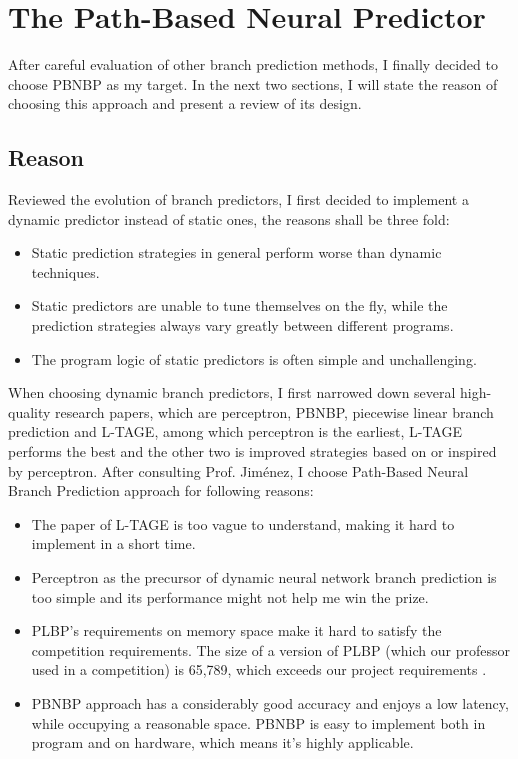 \documentclass[conference]{IEEEtran}
\begin{document}
\section{The Path-Based Neural Predictor}
After careful evaluation of other branch prediction methods, I finally decided to choose PBNBP as my target. In the next two sections, I will state the reason of choosing this approach and present a review of its design.
\subsection{Reason}
Reviewed the evolution of branch predictors, I first decided to implement a dynamic predictor instead of static ones, the reasons shall be three fold:
\begin{itemize}
	\item Static prediction strategies in general perform worse than dynamic techniques.
	\item Static predictors are unable to tune themselves on the fly, while the prediction strategies always vary greatly between different programs.
	\item The program logic of static predictors is often simple and unchallenging.
\end{itemize}

When choosing dynamic branch predictors, I first narrowed down several high-quality research papers, which are perceptron, PBNBP, piecewise linear branch prediction and L-TAGE, among which perceptron is the earliest, L-TAGE performs the best and the other two is improved strategies based on or inspired by perceptron. After consulting Prof. Jiménez, I choose Path-Based Neural Branch Prediction approach for following reasons:
\begin{itemize}
	\item The paper of L-TAGE is too vague to understand, making it hard to implement in a short time.
	\item Perceptron as the precursor of dynamic neural network branch prediction is too simple and its performance might not help me win the prize.
	\item PLBP's requirements on memory space make it hard to satisfy the competition requirements. The size of a version of PLBP (which our professor used in a competition) is 65,789, which exceeds our project requirements \cite{jimenez2005idealized}. 
	\item PBNBP approach has a considerably good accuracy and enjoys a low latency, while occupying a reasonable space. PBNBP is easy to implement both in program and on hardware, which means it's highly applicable.
\end{itemize}
\end{document}
